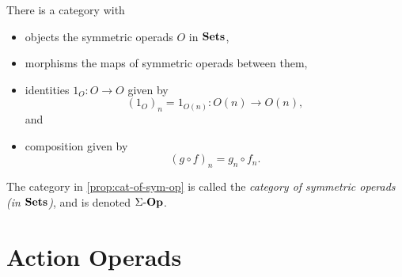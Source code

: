 \begin{prop}\label{prop:cat-of-sym-op}
There is a category with 
\begin{itemize}
\item objects the symmetric operads $O$ in $\mathbf{Sets}$, 
\item morphisms the maps of symmetric operads between them,
\item identities $1_O \colon O \to O$ given by
\[
(1_O)_n = 1_{O(n)} \colon O(n) \to O(n),
\]
and
\item composition given by
\[
(g \circ f)_n = g_n \circ f_n.
\]
\end{itemize}
\end{prop}

\begin{nota}\label{nota:cat-of-sym-op}
The category in \cref{prop:cat-of-sym-op} is called the \emph{category of symmetric operads (in $\mathbf{Sets}$)}, and is denoted $\Sigma\mbox{-}\mathbf{Op}$.
\end{nota}

\begin{rem}\label{rem:cat-of-nonsym-op}

\end{rem}

\begin{rem}\label{rem:cat-of-br-op}

\end{rem}

\section{Action Operads}\label{sec:aop}

